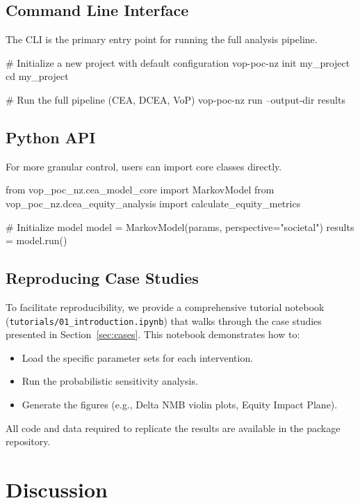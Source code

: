 \documentclass{article}
\newcommand{\code}[1]{\texttt{#1}}
\begin{document}
\subsection{Command Line Interface}
The CLI is the primary entry point for running the full analysis pipeline.
\begin{CodeInput}
# Initialize a new project with default configuration
vop-poc-nz init my_project
cd my_project

# Run the full pipeline (CEA, DCEA, VoP)
vop-poc-nz run --output-dir results
\end{CodeInput}

\subsection{Python API}
For more granular control, users can import core classes directly.
\begin{CodeInput}
from vop_poc_nz.cea_model_core import MarkovModel
from vop_poc_nz.dcea_equity_analysis import calculate_equity_metrics

# Initialize model
model = MarkovModel(params, perspective="societal")
results = model.run()
\end{CodeInput}

\subsection{Reproducing Case Studies}
To facilitate reproducibility, we provide a comprehensive tutorial notebook (\code{tutorials/01\_introduction.ipynb}) that walks through the case studies presented in Section~\ref{sec:cases}.
This notebook demonstrates how to:
\begin{itemize}
    \item Load the specific parameter sets for each intervention.
    \item Run the probabilistic sensitivity analysis.
    \item Generate the figures (e.g., Delta NMB violin plots, Equity Impact Plane).
\end{itemize}
All code and data required to replicate the results are available in the package repository.

\section{Discussion} \label{sec:discussion}
\end{document}
